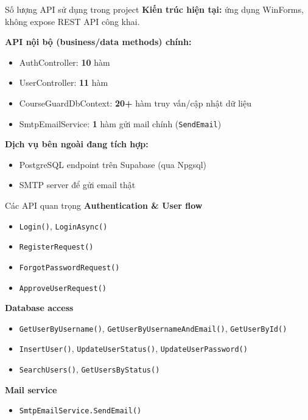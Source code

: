 \documentclass[aspectratio=169]{beamer}
\begin{document}
\begin{frame}{Số lượng API sử dụng trong project}
\textbf{Kiến trúc hiện tại:} ứng dụng WinForms, \alert{không expose REST API công khai}.

\vspace{0.5em}
\textbf{API nội bộ (business/data methods) chính:}
\begin{itemize}
  \item AuthController: \textbf{10} hàm
  \item UserController: \textbf{11} hàm
  \item CourseGuardDbContext: \textbf{20+} hàm truy vấn/cập nhật dữ liệu
  \item SmtpEmailService: \textbf{1} hàm gửi mail chính (\texttt{SendEmail})
\end{itemize}

\vspace{0.5em}
\textbf{Dịch vụ bên ngoài đang tích hợp:}
\begin{itemize}
  \item PostgreSQL endpoint trên Supabase (qua Npgsql)
  \item SMTP server để gửi email thật
\end{itemize}
\end{frame}

\begin{frame}{Các API quan trọng}
\textbf{Authentication \& User flow}
\begin{itemize}
  \item \texttt{Login()}, \texttt{LoginAsync()}
  \item \texttt{RegisterRequest()}
  \item \texttt{ForgotPasswordRequest()}
  \item \texttt{ApproveUserRequest()}
\end{itemize}

\textbf{Database access}
\begin{itemize}
  \item \texttt{GetUserByUsername()}, \texttt{GetUserByUsernameAndEmail()}, \texttt{GetUserById()}
  \item \texttt{InsertUser()}, \texttt{UpdateUserStatus()}, \texttt{UpdateUserPassword()}
  \item \texttt{SearchUsers()}, \texttt{GetUsersByStatus()}
\end{itemize}

\textbf{Mail service}
\begin{itemize}
  \item \texttt{SmtpEmailService.SendEmail()}
\end{itemize}
\end{frame}
\end{document}
